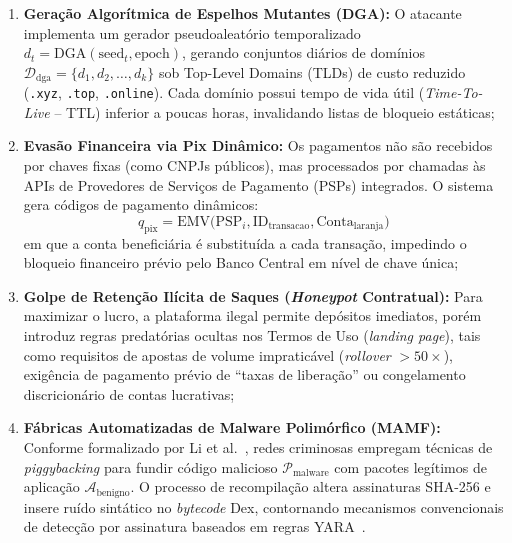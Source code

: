 \begin{enumerate}
    \item \textbf{Gera\c{c}\~{a}o Algor\'{i}tmica de Espelhos Mutantes (DGA):} O atacante implementa um gerador pseudoaleat\'{o}rio temporalizado $d_t = \text{DGA}(\text{seed}_t, \text{epoch})$, gerando conjuntos di\'{a}rios de dom\'{i}nios $\mathcal{D}_{\text{dga}} = \{d_1, d_2, \dots, d_k\}$ sob Top-Level Domains (TLDs) de custo reduzido (\texttt{.xyz}, \texttt{.top}, \texttt{.online}). Cada dom\'{i}nio possui tempo de vida \'{u}til (\textit{Time-To-Live} -- TTL) inferior a poucas horas, invalidando listas de bloqueio est\'{a}ticas;
    \item \textbf{Evas\~{a}o Financeira via Pix Din\^{a}mico:} Os pagamentos n\~{a}o s\~{a}o recebidos por chaves fixas (como CNPJs p\'{u}blicos), mas processados por chamadas \`{a}s APIs de Provedores de Servi\c{c}os de Pagamento (PSPs) integrados. O sistema gera c\'{o}digos de pagamento din\^{a}micos:
    \begin{equation}
        q_{\text{pix}} = \text{EMV}\big(\text{PSP}_i, \text{ID}_{\text{transacao}}, \text{Conta}_{\text{laranja}}\big)
    \end{equation}
    em que a conta benefici\'{a}ria \'{e} substitu\'{i}da a cada transa\c{c}\~{a}o, impedindo o bloqueio financeiro pr\'{e}vio pelo Banco Central em n\'{i}vel de chave \'{u}nica;
    \item \textbf{Golpe de Reten\c{c}\~{a}o Il\'{i}cita de Saques (\textit{Honeypot} Contratual):} Para maximizar o lucro, a plataforma ilegal permite dep\'{o}sitos imediatos, por\'{e}m introduz regras predat\'{o}rias ocultas nos Termos de Uso (\textit{landing page}), tais como requisitos de apostas de volume impratic\'{a}vel (\textit{rollover} $> 50\times$), exig\^{e}ncia de pagamento pr\'{e}vio de ``taxas de libera\c{c}\~{a}o'' ou congelamento discricion\'{a}rio de contas lucrativas;
    \item \textbf{F\'{a}bricas Automatizadas de Malware Polim\'{o}rfico (MAMF):} Conforme formalizado por Li et al.~\cite{li2025automated}, redes criminosas empregam t\'{e}cnicas de \textit{piggybacking} para fundir c\'{o}digo malicioso $\mathcal{P}_{\text{malware}}$ com pacotes leg\'{i}timos de aplica\c{c}\~{a}o $\mathcal{A}_{\text{benigno}}$. O processo de recompila\c{c}\~{a}o altera assinaturas SHA-256 e insere ru\'{i}do sint\'{a}tico no \textit{bytecode} Dex, contornando mecanismos convencionais de detec\c{c}\~{a}o por assinatura baseados em regras YARA~\cite{zhang2025fighting}.
\end{enumerate}

